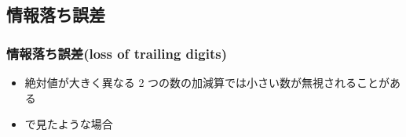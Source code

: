 \subsection{情報落ち誤差}
\begin{frame}[shrink]
\frametitle{情報落ち誤差(loss of trailing digits)}
  \begin{itemize}
\item 絶対値が大きく異なる 2 つの数の加減算では小さい数が無視されることがある
\item {} で見たような場合
  \end{itemize}
\end{frame}
